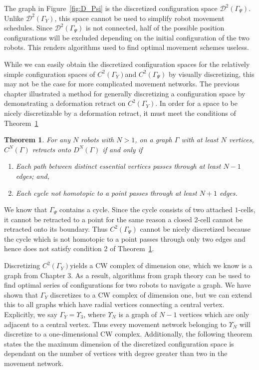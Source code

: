 \documentclass[12pt,oneside]{amsbook}
\newtheorem{thm}{Theorem}[chapter]
\newcommand{\Y}{\Gamma_Y}
\newcommand{\C}{$C^2(\Y)$}
\begin{document}
The graph in Figure~\ref{fig:D_Psi} is the discretized configuration space $\mathcal{D}^2(\Gamma_{\Psi})$. Unlike $\mathcal{D}^2(\Y)$, this space cannot be used to simplify robot movement schedules. Since $\mathcal{D}^2(\Gamma_{\Psi})$ is not connected, half of the possible position configurations will be excluded depending on the initial configuration of the two robots. This renders algorithms used to find optimal movement schemes useless. 

While we can easily obtain the discretized configuration spaces for the relatively simple configuration spaces of \C and $C^2(\Gamma_{\Psi})$ by visually discretizing, this may not be the case for more complicated movement networks. The previous chapter illustrated a method for generally discretizing a configuration space by demonstrating a deformation retract on \C. In order for a space to be nicely discretizable by a deformation retract, it must meet the conditions of Theorem~\ref{thm:when}

\begin{thm}\label{thm:when}
For any $N$ robots with $N>1$, on a graph $\Gamma$ with at least $N$ vertices, $C^N(\Gamma)$ retracts onto $D^N(\Gamma)$ if and only if 

\begin{enumerate}
\item Each path between distinct essential vertices passes through at least $N-1$ edges; and,
\item Each cycle not homotopic to a point passes through at least $N+1$ edges.\cite{factory}
\end{enumerate}
\end{thm}

We know that $\Gamma_{\Psi}$ contains a cycle. Since the cycle consists of two attached $1$-cells, it cannot be retracted to a point for the same reason a closed $2$-cell cannot be retracted onto its boundary. Thus $C^2(\Gamma_{\Psi})$ cannot be nicely discretized because the cycle which is not homotopic to a point passes through only two edges and hence does not satisfy condition 2 of Theorem~\ref{thm:when}.

Discretizing \C yields a CW complex of dimension one, which we know is a graph from Chapter 3. As a result, algorithms from graph theory can be used to find optimal series of configurations for two robots to navigate a graph. We have shown that $\Y$ discretizes to a CW complex of dimension one, but we can extend this to all graphs which have radial vertices connecting a central vertex. Explicitly, we say $\Y = \Upsilon_3$, where $\Upsilon_N$ is a graph of $N-1$ vertices which are only adjacent to a central vertex. Thus every movement network belonging to $\Upsilon_N$ will discretize to a one-dimensional CW complex. Additionally, the following theorem states the the maximum dimension of the discretized configuration space is dependant on the number of vertices with degree greater than two in the movement network.
\end{document}
